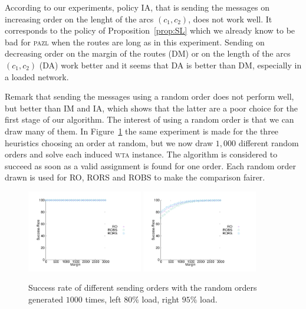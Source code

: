 \documentclass[a4paper,10pt]{article}
\newcommand\pazl{\textsc{pazl}\xspace}
\newcommand\wta{\textsc{wta}\xspace}
\begin{document}
          
     According to our experiments, policy IA, that is sending the messages on increasing order on the lenght of the arcs $(c_1,c_2)$, does not work well. It corresponds to the policy of Proposition~\ref{prop:SL} which we already know to be bad for \pazl when the routes are long as in this experiment. Sending on decreasing order on the margin of the routes (DM) or on the length of the arcs $(c_1,c_2)$ (DA) work better and it seems that DA is better than DM, especially in a loaded network. 
     
     Remark that sending the messages using a random order does not perform well,
     but better than IM and IA, which shows that the latter are a poor choice for the first stage of our algorithm. The interest of using a random order is that we can draw many of them. In Figure~\ref{fig:success1000random} the same experiment is made for the three heuristics choosing an order at random, but we now draw $1,000$ different random orders and solve each induced \wta instance. The algorithm is considered to succeed as soon as a valid assignment is found for one order. Each random order drawn is used for RO, RORS and ROBS to make the comparison fairer.
 
\begin{figure}[h] 
  \centering
  \includegraphics[width=0.45\textwidth]{departs_gp_25000.pdf}
    \includegraphics[width=0.45\textwidth]{departs_gp_21000.pdf}
    
       \caption{Success rate of different sending orders with the random orders generated $1000$ times, left $80\%$ load, right $95\%$ load.}
      \label{fig:success1000random}
          \end{figure}
\end{document}
